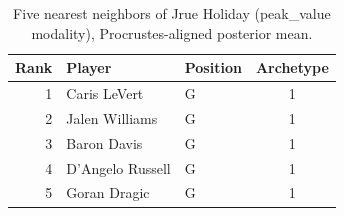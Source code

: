 \begin{table}[htbp]
  \centering\small
  \begin{tabular}{rllc}
    \toprule
    Rank & Player & Position & Archetype \\
    \midrule
    1 & Caris LeVert & G & 1 \\
    2 & Jalen Williams & G & 1 \\
    3 & Baron Davis & G & 1 \\
    4 & D'Angelo Russell & G & 1 \\
    5 & Goran Dragic & G & 1 \\
    \bottomrule
  \end{tabular}
  \caption{Five nearest neighbors of Jrue Holiday (peak_value modality), Procrustes-aligned posterior mean.}
  \label{tab:Jrue_Holiday_neighbors_peak_value}
\end{table}

